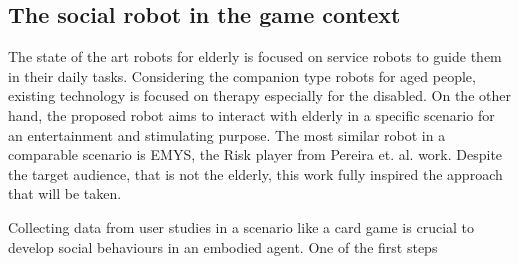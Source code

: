 \subsection{The social robot in the game context}
\label{sec:social_solution}

The state of the art robots for elderly is focused on service robots to guide them in their daily tasks.
Considering the companion type robots for aged people, existing technology is focused on therapy especially for the disabled.
On the other hand, the proposed robot aims to interact with elderly in a specific scenario for an entertainment and stimulating purpose.
The most similar robot in a comparable scenario is EMYS, the Risk player from Pereira et. al. work.
Despite the target audience, that is not the elderly, this work fully inspired the approach that will be taken.

Collecting data from user studies in a scenario like a card game is crucial to develop social behaviours in an embodied agent.
One of the first steps





